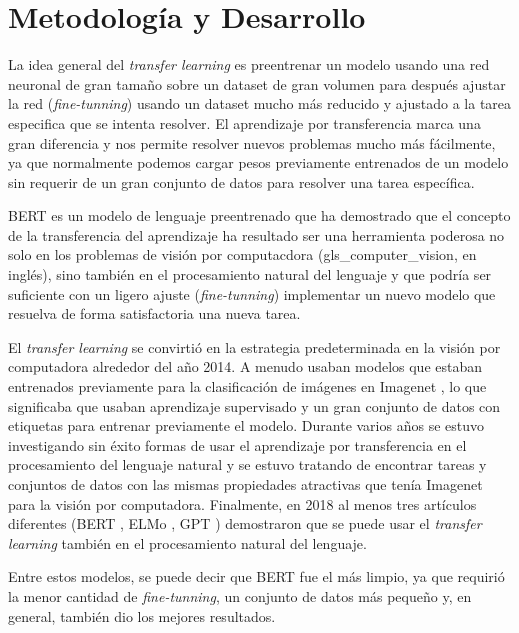 
\cleardoublepage

\chapter{Metodología y Desarrollo}
\label{chapter-metodologia-desarrollo}

La idea general del \textit{transfer learning} es preentrenar un modelo usando una red neuronal de gran tamaño sobre un dataset de gran volumen para después ajustar la red (\textit{fine-tunning}) usando un dataset mucho más reducido y ajustado a la tarea especifica que se intenta resolver. El aprendizaje por transferencia marca una gran diferencia y nos permite resolver nuevos problemas mucho más fácilmente, ya que normalmente podemos cargar pesos previamente entrenados de un modelo sin requerir de un gran conjunto de datos para resolver una tarea específica.

BERT es un modelo de lenguaje preentrenado que ha demostrado que el concepto de la transferencia del aprendizaje ha resultado ser una herramienta poderosa no solo en los problemas de visión por computacdora (\gls{gls_computer_vision}, en inglés), sino también en el procesamiento natural del lenguaje y que podría ser suficiente con un ligero ajuste (\textit{fine-tunning}) implementar un nuevo modelo que resuelva de forma satisfactoria  una nueva tarea.

El \textit{transfer learning} se convirtió en la estrategia predeterminada en la visión por computadora alrededor del año 2014. A menudo usaban modelos que estaban entrenados previamente para la clasificación de imágenes en Imagenet \cite{Olga2015Imagenet}, lo que significaba que usaban aprendizaje supervisado y un gran conjunto de datos con etiquetas para entrenar previamente el modelo. Durante varios años se estuvo investigando sin éxito formas de usar el aprendizaje por transferencia en el procesamiento del lenguaje natural y se estuvo tratando de encontrar tareas y conjuntos de datos con las mismas propiedades atractivas que tenía Imagenet para la visión por computadora. Finalmente, en 2018 al menos tres artículos diferentes (BERT \cite{https://doi.org/10.48550/arxiv.1810.04805}, ELMo \cite{Peters2018Elmo}, GPT \cite{radford2018improving}) demostraron que se puede usar el \textit{transfer learning} también en el procesamiento natural del lenguaje. 

Entre estos modelos, se puede decir que BERT fue el más limpio, ya que requirió la menor cantidad de \textit{fine-tunning}, un conjunto de datos más pequeño y, en general, también dio los mejores resultados.

